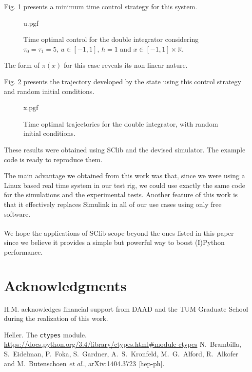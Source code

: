 \documentclass[10pt, a4paper, twocolumn]{article}
\begin{document}
{Fig. \ref{fig:toc} presents a minimum time control strategy for this system.
\begin{figure}[htb]
    \centering
    {
    {u.pgf}}
    \caption{Time optimal control for the double integrator considering
        $\tau_0=\tau_1=5$, $u\in[-1,1]$, $h=1$ and $x\in[-1, 1]\times\mathbb{R}$.
}
    \label{fig:toc}
\end{figure}
The form of $\pi(x)$ for this case reveals its non-linear nature.

Fig. \ref{fig:x} presents the trajectory developed by the state using this
control strategy and random initial conditions.
\begin{figure}[htb]
    \centering
    {
    {x.pgf}}
    \caption{Time optimal trajectories for the double integrator, with random
    initial conditions.}
    \label{fig:x}
\end{figure}

These results were obtained using SClib and the devised simulator. The example
code is ready to reproduce them.

The main advantage we obtained from this work was that, since we were using a
Linux based real time system in our test rig, we could use exactly the same code
for the simulations and the experimental tests.  Another feature of this work is
that it effectively replaces Simulink in all of our use cases using only free
software.\\
\\
We hope the applications of SClib scope beyond the ones listed in this paper since we believe it provides a simple but powerful way to boost (I)Python performance.

\section*{Acknowledgments}
H.M. acknowledges financial support from DAAD and the TUM Graduate School during the realization of this work. 

\begin{thebibliography}{99}

Heller. The \verb+ctypes+ module.
\url{https://docs.python.org/3.4/library/ctypes.html#module-ctypes}
  N.~Brambilla, S.~Eidelman, P.~Foka, S.~Gardner, A.~S.~Kronfeld, M.~G.~Alford, R.~Alkofer and M.~Butenschoen {\it et al.},
  arXiv:1404.3723 [hep-ph].


\end{thebibliography}}
\end{document}
